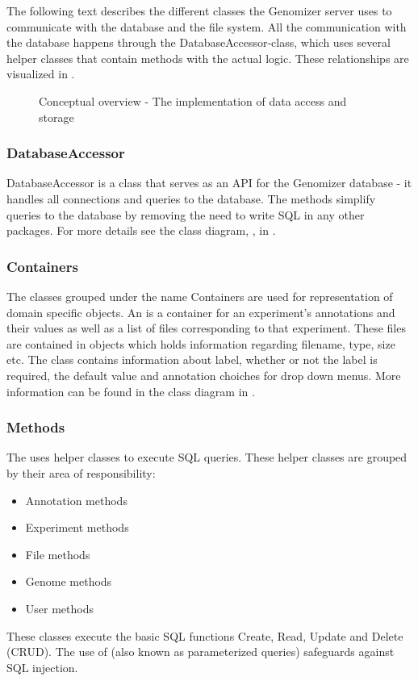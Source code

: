 The following text describes the different classes the Genomizer server uses to communicate with the database and the file system. All the communication with the database happens through the DatabaseAccessor-class, which uses several helper classes that contain methods with the actual logic. These relationships are visualized in . 

\begin{figure}[h]
\caption{Conceptual overview - The implementation of data access and storage}
\label{fig:dat_overview_schema}
\end{figure}

\subsubsection{DatabaseAccessor}
DatabaseAccessor is a class that serves as an API for the Genomizer database - it handles all connections and queries to the database. The methods simplify queries to the database by removing the need to write SQL in any other packages. For more details see the class diagram, , in .

\subsubsection{Containers}
The classes grouped under the name Containers are used for representation of domain specific objects. An  is a container for an experiment's annotations and their values as well as a list of files corresponding to that experiment. These files are contained in  objects which holds information regarding filename, type, size etc. The  class contains information about label, whether or not the label is required, the default value and annotation choiches for drop down menus. More information can be found in the class diagram  in .

\subsubsection{Methods}
The  uses helper classes to execute SQL queries. These helper classes are grouped by their area of responsibility:
\begin{itemize}
\item Annotation methods
\item Experiment methods
\item File methods
\item Genome methods
\item User methods
\end{itemize}
These classes execute the basic SQL functions Create, Read, Update and Delete (CRUD). The use of  (also known as parameterized queries) safeguards against SQL injection.

